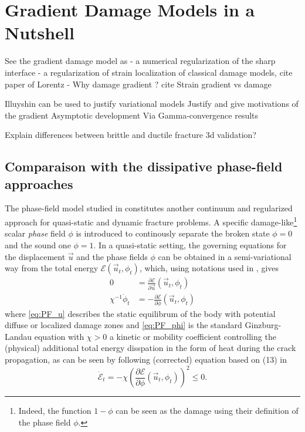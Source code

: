 \section{Gradient Damage Models in a Nutshell} \label{sec:graddamage}
See the gradient damage model as
- a numerical regularization of the sharp interface
- a regularization of strain localization of classical damage models, cite paper of Lorentz
- Why damage gradient ? cite Strain gradient vs damage

Illuyshin can be used to justify variational models
Justify and give motivations of the gradient
Asymptotic development
Via Gamma-convergence results

Explain differences between brittle and ductile fracture
3d validation?

\subsection{Comparaison with the dissipative phase-field approaches}

The phase-field model studied in \cite{KarmaKesslerLevine:2001,HakimKarma:2009} constitutes another continuum and regularized approach for quasi-static and dynamic fracture problems. A specific damage-like\footnote{Indeed, the function $1-\phi$ can be seen as the damage using their definition of the phase field $\phi$.} scalar \emph{phase} field $\phi$ is introduced to continously separate the broken state $\phi=0$ and the sound one $\phi=1$. In a quasi-static setting, the governing equations for the displacement $\vec{u}$ and the phase fields $\phi$ can be obtained in a semi-variational way from the total energy $\mathcal{E}(\vec{u}_t,\phi_t)$, which, using notations used in \cite{HakimKarma:2009}, gives
\begin{align}
0 &= \frac{\partial\mathcal{E}}{\partial\vec{u}}(\vec{u}_t,\phi_t) \label{eq:PF_u} \\
\chi^{-1}\dot{\phi}_t &= -\frac{\partial\mathcal{E}}{\partial\phi}(\vec{u}_t,\phi_t) \label{eq:PF_phi}
\end{align}
where \eqref{eq:PF_u} describes the static equilibrum of the body with potential diffuse or localized damage zones and \eqref{eq:PF_phi} is the standard Ginzburg-Landau equation with $\chi>0$ a kinetic or mobility \cite{KuhnMuller:2010} coefficient controlling the (physical) additional total energy disspation in the form of heat during the crack propagation, as can be seen by following (corrected) equation based on (13) in \cite{HakimKarma:2009}
\begin{equation} \label{eq:PF_dissipation}
\dot{\mathcal{E}}_t=-\chi\left(\frac{\partial\mathcal{E}}{\partial\phi}(\vec{u}_t,\phi_t)\right)^2\leq 0.
\end{equation}

